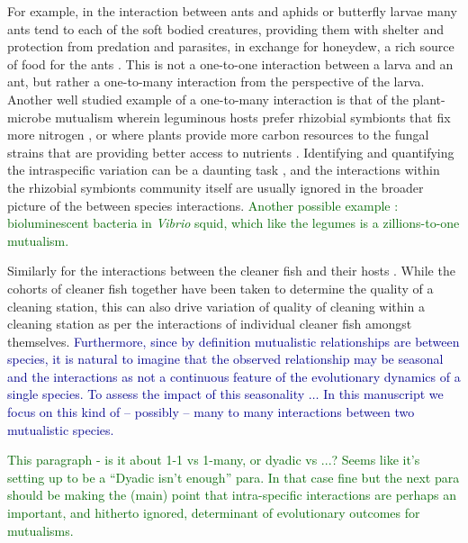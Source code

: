 \documentclass{pnastwo}
\newcommand{\cha}[1]{\textcolor{darkblue}{#1}}
\newcommand{\marcus}[1]{\textcolor{darkgreen}{#1}}
\begin{document}
\begin{article}
For example, in the interaction between ants and aphids or butterfly larvae \cite{pierce:BES:1987,hoelldobler:book:1990} many ants tend to each of the soft bodied creatures, providing them with shelter and protection from predation and parasites, in exchange for honeydew, a rich source of food for the ants \cite{hill:OEC:1989,stadler:book:2008}.
This is not a one-to-one interaction between a larva and an ant, but rather a one-to-many interaction from the perspective of the larva.
Another well studied example of a one-to-many interaction is that of the plant-microbe mutualism wherein leguminous hosts prefer rhizobial symbionts that fix more nitrogen \cite{kiers:Nature:2003}, or where plants provide more carbon resources to the fungal strains that are providing better access to nutrients \cite{kiers:Science:2011}.
Identifying and quantifying the intraspecific variation can be a daunting task \cite{behm:JE:2014}, and the interactions within the rhizobial symbionts community itself are usually ignored in the broader picture of the between species interactions. 
\marcus{Another possible example : bioluminescent bacteria in {\it Vibrio} squid, which like the legumes is a zillions-to-one mutualism.}

Similarly for the interactions between the cleaner fish and their hosts \cite{bshary:AB:2002,bshary:book:2003}. 
While the cohorts of cleaner fish together have been taken to determine the quality of a cleaning station, this can also drive variation of quality of cleaning within a cleaning station as per the interactions of individual cleaner fish amongst themselves.
\cha{Furthermore, since by definition mutualistic relationships are between species, it is natural to imagine that the observed relationship may be seasonal and the interactions as not a continuous feature of the evolutionary dynamics of a single species.
To assess the impact of this seasonality $\ldots$
In this manuscript we focus on this kind of -- possibly -- many to many interactions between two mutualistic species.}

\marcus{This paragraph - is it about 1-1 vs 1-many, or dyadic vs ...?  Seems like it's setting up to be a ``Dyadic isn't enough'' para. In that case fine but the next para should be making the (main) point that intra-specific interactions are perhaps an important, and hitherto ignored, determinant of evolutionary outcomes for mutualisms.  }


\end{article}
\end{document}
